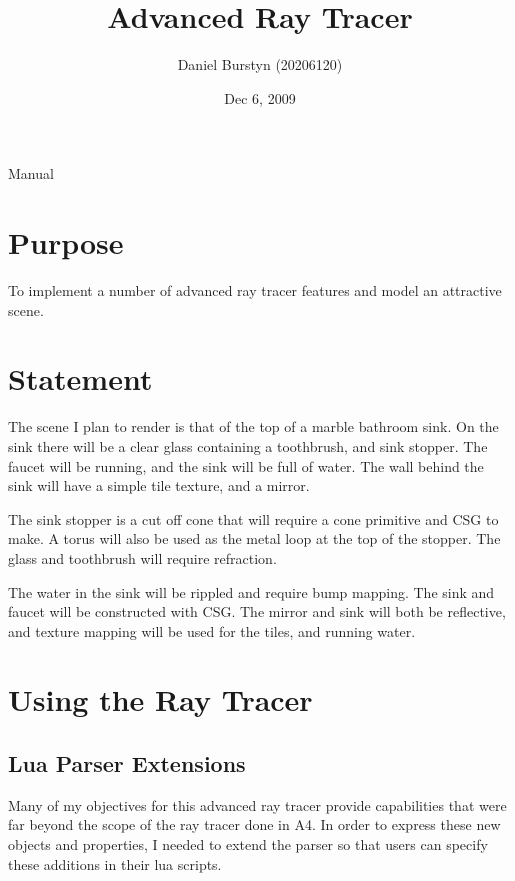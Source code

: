 \documentclass {article}
\title{Advanced Ray Tracer}
\author{Daniel Burstyn (20206120)}
\date{Dec 6, 2009}
\begin{document}
\maketitle
\newpage


\begin{center}
\begin{Huge}
Manual
\end{Huge}
\end{center}

\section{Purpose}
To implement a number of advanced ray tracer features and model an attractive
scene.

\section{Statement}
The scene I plan to render is that of the top of a marble bathroom sink.  On the
sink there will be a clear glass containing a toothbrush, and sink stopper.
The faucet will be running, and the sink will be full of water.  The wall behind
the sink will have a simple tile texture, and a mirror.

The sink stopper is a cut off cone that will require a cone primitive and CSG to
make.  A torus will also be used as the metal loop at the top of the stopper.
The glass and toothbrush will require refraction.

The water in the sink will be rippled and require bump mapping.  The sink and
faucet will be constructed with CSG.  The mirror and sink will both be
reflective, and texture mapping will be used for the tiles, and running water.

\section{Using the Ray Tracer}

\subsection{Lua Parser Extensions}
Many of my objectives for this advanced ray tracer provide capabilities that
were far beyond the scope of the ray tracer done in A4.  In order to express
these new objects and properties, I needed to extend the parser so that users
can specify these additions in their lua scripts.
\end{document}
